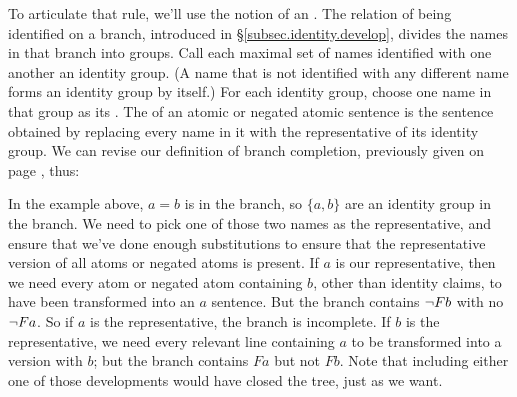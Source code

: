To articulate that rule, we'll use the notion of an . 
The relation of being identified on a branch, introduced in \S\ref{subsec.identity.develop}, divides the names in that branch into groups. Call each maximal set of names identified with one another an identity group. (A name that is not identified with any different name forms an identity group by itself.) For each identity group, choose one name in that group as its . The  of an atomic or negated atomic sentence is the sentence obtained by replacing every name in it with the representative of its identity group. We can revise our definition of branch completion, previously given on page \pageref{branchcompletion.defined}, thus: 







In the example above, $a{=}b$ is in the branch, so $\{a,b\}$ are an identity group in the branch. We need to pick one of those two names as the representative, and ensure that we've done enough substitutions to ensure that the representative version of all atoms or negated atoms is present. If $a$ is our representative, then we need every atom or negated atom containing $b$, other than identity claims, to have been transformed into an $a$ sentence. But the branch contains $\neg Fb$ with no $\neg Fa$. So if $a$ is the representative, the branch is incomplete. If $b$ is the representative, we need every relevant line containing $a$ to be transformed into a version with $b$; but the branch contains $Fa$ but not $Fb$. Note that including either one of those developments would have closed the tree, just as we want.

